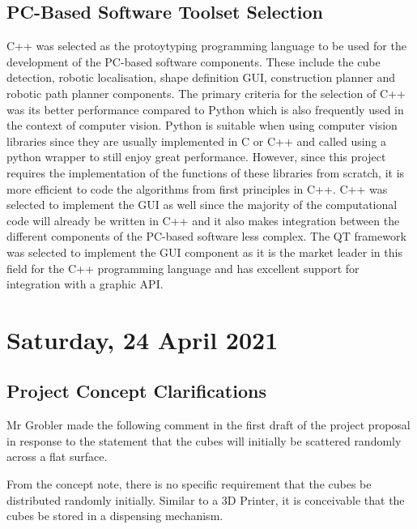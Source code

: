 \subsection{PC-Based Software Toolset Selection}

C++ was selected as the protoytyping programming language to be used for the development of the PC-based software components. These include the cube detection, robotic localisation, shape definition \ac{GUI}, construction planner and robotic path planner components. The primary criteria for the selection of C++ was its better performance compared to Python which is also frequently used in the context of computer vision. Python is suitable when using computer vision libraries since they are usually implemented in C or C++ and called using a python wrapper to still enjoy great performance. However, since this project requires the implementation of the functions of these libraries from scratch, it is more efficient to code the algorithms from first principles in C++. C++ was selected to implement the \ac{GUI} as well since the majority of the computational code will already be written in C++ and it also makes integration between the different components of the PC-based software less complex. The QT framework was selected to implement the \ac{GUI} component as it is the market leader in this field for the C++ programming language and has excellent support for integration with a graphic \ac{API}.

\pendsign

\section[2021/04/24]{Saturday, 24 April 2021}

\subsection{Project Concept Clarifications}
\label{sec:concept_clarifications_24_04_2021}

Mr Grobler made the following comment in the first draft of the project proposal in response to the statement that the cubes will initially be scattered randomly across a flat surface.

\begin{slantnote}
From the concept note, there is no specific requirement that the cubes be distributed randomly initially. Similar to a 3D Printer, it is conceivable that the cubes be stored in a dispensing mechanism.
\end{slantnote}

